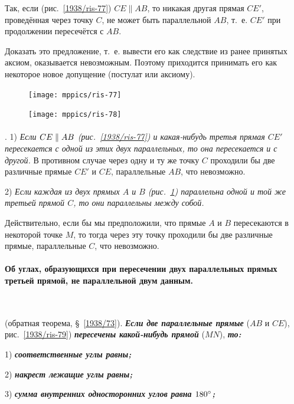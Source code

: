 \documentclass[oneside]{book}
\begin{document}
Так, если (рис.~\ref{1938/ris-77}) $CE\parallel AB$, то никакая другая прямая $CE'$, проведённая через точку $C$, не может быть параллельной $AB$, т.~е. $CE'$ при продолжении пересечётся с $AB$.

Доказать это предложение, т.~е. вывести его как следствие из ранее принятых аксиом, оказывается невозможным.
Поэтому приходится принимать его как некоторое новое допущение (постулат или аксиому).

\begin{figure}
\centering
\texttt{[image: mppics/ris-77]}
\caption{}\label{1938/ris-77}
\bigskip
\texttt{[image: mppics/ris-78]}
\caption{}\label{1938/ris-78}
\end{figure}

\paragraph{}\label{1938/76}
\mbox{.}
1) \emph{Если $CE\z\parallel AB$ \emph{(рис.~\ref{1938/ris-77})} и какая-нибудь третья прямая $CE'$ пересекается с одной из этих двух параллельных, то она пересекается и с другой.}
В противном случае через одну и ту же точку $C$ проходили бы две различные прямые $CE'$ и $CE$, параллельные $AB$, что невозможно.

2) \emph{Если каждая из двух прямых $A$ и $B$ \emph{(рис.~\ref{1938/ris-78})} параллельна одной и той же третьей прямой $C$, то они параллельны между собой.}

Действительно, если бы мы предположили, что прямые $A$ и $B$ пересекаются в некоторой точке $M$, то тогда через эту точку проходили бы две различные прямые, параллельные $C$, что невозможно.

\paragraph{Об углах, образующихся при пересечении двух параллельных прямых третьей прямой, не параллельной двум данным.}\label{1938/77}\ %

 (обратная теорема, §~\ref{1938/73}).
\textbf{\emph{Если две параллельные прямые}} ($AB$ и $CE$), рис.~\ref{1938/ris-79}) \textbf{\emph{пересечены какой-нибудь прямой}} ($MN$), \textbf{\emph{то:}}


1) \textbf{\emph{соответственные углы равны;}}

2) \textbf{\emph{накрест лежащие углы равны;}}

3) \textbf{\emph{сумма внутренних односторонних углов равна $180\degree$;}}
\end{document}
